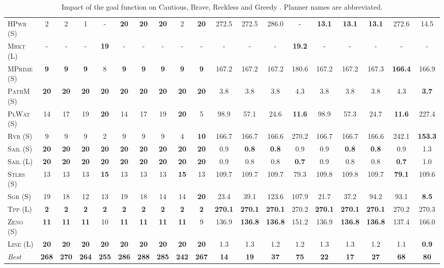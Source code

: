\documentclass[11pt,landscape]{article}
\begin{document}
\begin{table}[tb]
{\begin{tabular}{|l||ccccccccc||ccccccccc||}
\textsc{HPwr} (S)&2&2&1&-&\textbf{20}&\textbf{20}&\textbf{20}&2&\textbf{20}&272.5&272.5&286.0&-&\textbf{13.1}&\textbf{13.1}&\textbf{13.1}&272.6&14.5\\
\textsc{Mrkt} (L)&-&-&-&\textbf{19}&-&-&-&-&-&-&-&-&\textbf{19.2}&-&-&-&-&-\\
\textsc{MPrime} (S)&\textbf{9}&\textbf{9}&\textbf{9}&8&\textbf{9}&\textbf{9}&\textbf{9}&\textbf{9}&\textbf{9}&167.2&167.2&167.2&180.6&167.2&167.2&167.3&\textbf{166.4}&166.9\\
\textsc{PathM} (S)&\textbf{20}&\textbf{20}&\textbf{20}&\textbf{20}&\textbf{20}&\textbf{20}&\textbf{20}&\textbf{20}&\textbf{20}&3.8&3.8&3.8&4.3&3.8&3.8&3.8&4.3&\textbf{3.7}\\
\textsc{PlWat} (S)&14&17&19&\textbf{20}&14&17&19&\textbf{20}&5&98.9&57.1&24.6&\textbf{11.6}&98.9&57.3&24.7&\textbf{11.6}&227.4\\
\textsc{Rvr} (S)&9&9&9&2&9&9&9&4&\textbf{10}&166.7&166.7&166.6&270.2&166.7&166.7&166.6&242.1&\textbf{153.3}\\
\textsc{Sail} (S)&\textbf{20}&\textbf{20}&\textbf{20}&\textbf{20}&\textbf{20}&\textbf{20}&\textbf{20}&\textbf{20}&\textbf{20}&0.9&\textbf{0.8}&\textbf{0.8}&0.9&0.9&\textbf{0.8}&\textbf{0.8}&0.9&1.3\\
\textsc{Sail} (L)&\textbf{20}&\textbf{20}&\textbf{20}&\textbf{20}&\textbf{20}&\textbf{20}&\textbf{20}&\textbf{20}&\textbf{20}&0.9&0.8&0.8&\textbf{0.7}&0.9&0.8&0.8&\textbf{0.7}&1.0\\
\textsc{Stlrs} (S)&13&13&13&\textbf{15}&13&13&13&\textbf{15}&13&109.7&109.7&109.7&79.3&109.8&109.8&109.7&\textbf{79.1}&109.6\\
\textsc{Sgr} (S)&19&18&12&13&19&18&14&14&\textbf{20}&23.4&39.1&123.6&107.9&21.7&37.2&94.2&93.1&\textbf{8.5}\\
\textsc{Tpp} (L)&\textbf{2}&\textbf{2}&\textbf{2}&\textbf{2}&\textbf{2}&\textbf{2}&\textbf{2}&\textbf{2}&\textbf{2}&\textbf{270.1}&\textbf{270.1}&\textbf{270.1}&270.2&\textbf{270.1}&\textbf{270.1}&\textbf{270.1}&270.2&270.3\\
\textsc{Zeno} (S)&\textbf{11}&\textbf{11}&\textbf{11}&10&\textbf{11}&\textbf{11}&\textbf{11}&\textbf{11}&9&136.9&\textbf{136.8}&\textbf{136.8}&151.2&136.9&\textbf{136.8}&\textbf{136.8}&137.4&166.0\\
\textsc{Line} (L)&\textbf{20}&\textbf{20}&\textbf{20}&\textbf{20}&\textbf{20}&\textbf{20}&\textbf{20}&\textbf{20}&\textbf{20}&1.3&1.3&1.2&1.2&1.3&1.3&1.2&1.1&\textbf{0.9}
\\\hline
\textit{Best}&\textbf{268}&\textbf{270}&\textbf{264}&\textbf{255}&\textbf{286}&\textbf{288}&\textbf{285}&\textbf{242}&\textbf{267}&\textbf{14}&\textbf{19}&\textbf{37}&\textbf{75}&\textbf{22}&\textbf{17}&\textbf{27}&\textbf{68}&\textbf{80}\\\hline

        \end{tabular}}
        \caption{Impact of the goal function on Cautious, Brave, Reckless and Greedy \pattyd. Planner names are abbreviated.}
        \label{tab:abl-gf}
        \end{table}
        
\end{document}
